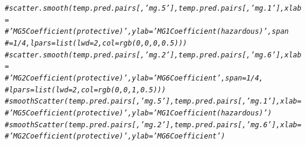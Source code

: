 \documentclass{article}\usepackage[]{graphicx}\usepackage[]{color}
\makeatletter
\newcommand{\hlcom}[1]{\textcolor[rgb]{0.678,0.584,0.686}{\textit{#1}}}%
\newenvironment{kframe}{%
 \def\at@end@of@kframe{}%
 \ifinner\ifhmode%
  \def\at@end@of@kframe{\end{minipage}}%
  \begin{minipage}{\columnwidth}%
 \fi\fi%
 \def\FrameCommand##1{\hskip\@totalleftmargin \hskip-\fboxsep
 \colorbox{shadecolor}{##1}\hskip-\fboxsep
     \hskip-\linewidth \hskip-\@totalleftmargin \hskip\columnwidth}%
 \MakeFramed {\advance\hsize-\width
   \@totalleftmargin\z@ \linewidth\hsize
   \@setminipage}}%
 {\par\unskip\endMakeFramed%
 \at@end@of@kframe}
\newenvironment{knitrout}{}{} %
\makeatother
\begin{document}
\begin{knitrout}
{}


\begin{kframe}\begin{alltt}
\hlcom{# scatter.smooth(temp.pred.pairs[,'mg.5'], temp.pred.pairs[,'mg.1'], xlab =}
\hlcom{# 'MG5 Coefficient (protective)', ylab = 'MG1 Coefficient (hazardous)', span}
\hlcom{# = 1/4, lpars = list(lwd = 2, col = rgb(0, 0, 0, 0.5)))}
\hlcom{# scatter.smooth(temp.pred.pairs[,'mg.2'], temp.pred.pairs[,'mg.6'], xlab =}
\hlcom{# 'MG2 Coefficient (protective)', ylab = 'MG6 Coefficient', span = 1/4,}
\hlcom{# lpars = list(lwd = 2, col = rgb(0, 0, 1, 0.5)))}
\hlcom{# smoothScatter(temp.pred.pairs[,'mg.5'], temp.pred.pairs[,'mg.1'], xlab =}
\hlcom{# 'MG5 Coefficient (protective)', ylab = 'MG1 Coefficient (hazardous)')}
\hlcom{# smoothScatter(temp.pred.pairs[,'mg.2'], temp.pred.pairs[,'mg.6'], xlab =}
\hlcom{# 'MG2 Coefficient (protective)', ylab = 'MG6 Coefficient')}


\end{alltt}
\end{kframe}
\end{knitrout}
\end{document}

